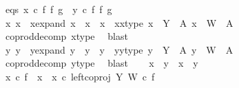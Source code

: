 \begin{isabellebody}
\ eqs{\isacharcolon}{\kern0pt}\ {\isachardoublequoteopen}x\ {\isasymcirc}\isactrlsub c\ f\ {\isasymbowtie}\isactrlsub f\ g\ {\isacharequal}{\kern0pt}\ y\ {\isasymcirc}\isactrlsub c\ f\ {\isasymbowtie}\isactrlsub f\ g{\isachardoublequoteclose}\isanewline
\isanewline
\ \ \isamarkupfalse%
\ x{}\ x{}\ \ x{\isacharunderscore}{\kern0pt}expand{\isacharcolon}{\kern0pt}\ {\isachardoublequoteopen}x\ {\isacharequal}{\kern0pt}\ x{}\ {\isasymamalg}\ x{}{\isachardoublequoteclose}\ \ x{}{\isacharunderscore}{\kern0pt}x{}{\isacharunderscore}{\kern0pt}type{\isacharcolon}{\kern0pt}\ {\isachardoublequoteopen}x{}\ {\isacharcolon}{\kern0pt}\ Y\ {\isasymrightarrow}\ A{\isachardoublequoteclose}\ {\isachardoublequoteopen}x{}\ {\isacharcolon}{\kern0pt}\ W\ {\isasymrightarrow}\ A{\isachardoublequoteclose}\isanewline
\ \ \ \ \isamarkupfalse%
\ coprod{\isacharunderscore}{\kern0pt}decomp\ x{\isacharunderscore}{\kern0pt}type\ \isamarkupfalse%
\ blast\isanewline
\ \ \isamarkupfalse%
\ y{}\ y{}\ \ y{\isacharunderscore}{\kern0pt}expand{\isacharcolon}{\kern0pt}\ {\isachardoublequoteopen}y\ {\isacharequal}{\kern0pt}\ y{}\ {\isasymamalg}\ y{}{\isachardoublequoteclose}\ \ y{}{\isacharunderscore}{\kern0pt}y{}{\isacharunderscore}{\kern0pt}type{\isacharcolon}{\kern0pt}\ {\isachardoublequoteopen}y{}\ {\isacharcolon}{\kern0pt}\ Y\ {\isasymrightarrow}\ A{\isachardoublequoteclose}\ {\isachardoublequoteopen}y{}\ {\isacharcolon}{\kern0pt}\ W\ {\isasymrightarrow}\ A{\isachardoublequoteclose}\isanewline
\ \ \ \ \isamarkupfalse%
\ coprod{\isacharunderscore}{\kern0pt}decomp\ y{\isacharunderscore}{\kern0pt}type\ \isamarkupfalse%
\ blast\isanewline
\isanewline
\ \ \isamarkupfalse%
\ {\isachardoublequoteopen}{\isacharparenleft}{\kern0pt}x{}\ {\isacharequal}{\kern0pt}\ y{}{\isacharparenright}{\kern0pt}\ {\isasymand}\ {\isacharparenleft}{\kern0pt}x{}\ {\isacharequal}{\kern0pt}\ y{}{\isacharparenright}{\kern0pt}{\isachardoublequoteclose}\isanewline
\ \ \isamarkupfalse%
\isanewline
\ \ \ \ \isamarkupfalse%
\ {\isachardoublequoteopen}x{}\ {\isasymcirc}\isactrlsub c\ f\ {\isacharequal}{\kern0pt}\ {\isacharparenleft}{\kern0pt}{\isacharparenleft}{\kern0pt}x{}\ {\isasymamalg}\ x{}{\isacharparenright}{\kern0pt}\ {\isasymcirc}\isactrlsub c\ left{\isacharunderscore}{\kern0pt}coproj\ Y\ W{\isacharparenright}{\kern0pt}\ {\isasymcirc}\isactrlsub c\ f{\isachardoublequoteclose}\isanewline

\end{isabellebody}
